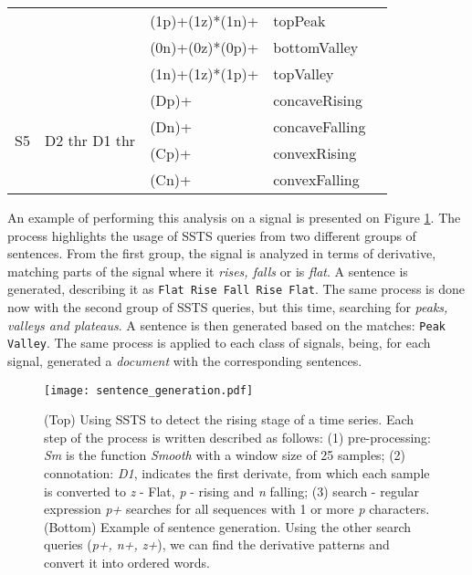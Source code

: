\begin{table}
\begin{center}
\begin{tabularx}{\linewidth}{ XXXXX }
 & & (1p)+(1z)*(1n)+ & \textcolor{myblue2}{topPeak}\\
 & & (0n)+(0z)*(0p)+ & \textcolor{mypurple}{bottomValley}\\
 & & (1n)+(1z)*(1p)+ & \textcolor{myorange}{topValley}\\
 \hline
\multirow{4}{1em}{S5} & \multirow{4}{6em}{D2 thr D1 thr} & (Dp)+ & concaveRising\\
& & (Dn)+ & concaveFalling\\
& & (Cp)+ & convexRising\\
& &(Cn)+ & convexFalling\\
\bottomrule[1.5pt]
\end{tabularx}
\label{tab:ssts_queries}
\end{center}
\end{table}
 
An example of performing this analysis on a signal is presented on Figure \ref{fig:SSTS_example}. The process highlights the usage of \gls{SSTS} queries from two different groups of sentences. From the first group, the signal is analyzed in terms of derivative, matching parts of the signal where it \textit{rises, falls} or is \textit{flat}. A sentence is generated, describing it as \texttt{Flat Rise Fall Rise Flat}. The same process is done now with the second group of \gls{SSTS} queries, but this time, searching for \textit{peaks, valleys and plateaus}. A sentence is then generated based on the matches: \texttt{Peak Valley}. The same process is applied to each class of signals, being, for each signal, generated a \textit{document} with the corresponding sentences.

\begin{figure}[!h]
    \centering
    \texttt{[image: sentence\_generation.pdf]}
    \caption{(Top) Using SSTS to detect the rising stage of a time series. Each step of the process is written described as follows: (1) pre-processing: \textit{Sm} is the function \textit{Smooth} with a window size of 25 samples; (2) connotation: \textit{D1}, indicates the first derivate, from which each sample is converted to \textit{z} - Flat, \textit{p} - rising and \textit{n} falling; (3) search - regular expression \textit{p+} searches for all sequences with 1 or more \textit{p} characters. (Bottom) Example of sentence generation. Using the other search queries (\textit{p+, n+, z+}), we can find the derivative patterns and convert it into ordered words.}
    \label{fig:SSTS_example}
\end{figure}

